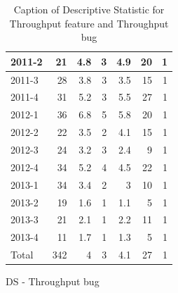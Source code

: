 \documentclass[UKenglish]{ifimaster}  %
\begin{document}
\begin{appendices}
\begin{table}[!htbp]
\begin{adjustwidth}{-1.5cm}{}
\begin{subfigure}[b]{0.3\textwidth}
{\begin{tabular}{ | l | r | r | r | r | r | r | }
 2011-2  & 21 & 4.8 & 3 & 4.9 & 20 & 1 \\ \hline
 2011-3  & 28 & 3.8 & 3 & 3.5 & 15 & 1 \\ \hline
 2011-4  & 31 & 5.2 & 3 & 5.5 & 27 & 1 \\ \hline
 2012-1  & 36 & 6.8 & 5 & 5.8 & 20 & 1 \\ \hline
 2012-2  & 22 & 3.5 & 2 & 4.1 & 15 & 1 \\ \hline
 2012-3  & 24 & 3.2 & 3 & 2.4 & 9 & 1 \\ \hline
 2012-4  & 34 & 5.2 & 4 & 4.5 & 22 & 1 \\ \hline
 2013-1  & 34 & 3.4 & 2 & 3 & 10 & 1 \\ \hline
 2013-2  & 19 & 1.6 & 1 & 1.1 & 5 & 1 \\ \hline
 2013-3  & 21 & 2.1 & 1 & 2.2 & 11 & 1 \\ \hline
 2013-4  & 11 & 1.7 & 1 & 1.3 & 5 & 1 \\ \hline
 Total  & 342 & 4 & 3 & 4.1 & 27 & 1 \\ \hline
\end{tabular}
}
\caption{DS - Throughput bug}
 \label{DS:TPB:3}
\end{subfigure}
\end{adjustwidth}
\caption[Optional caption for list of figures]{Caption of Descriptive Statistic for Throughput feature and Throughput bug}
\label{DS:3:2}
\end{table}





\end{appendices}
\end{document}
